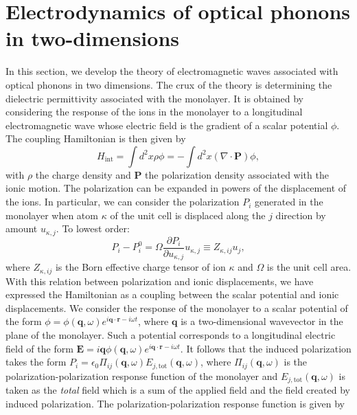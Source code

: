 \documentclass[aps,prb,twocolumn,
	groupedaddress,superscriptaddress,
	amsfonts,amssymb,amsmath,floatfix,
	citeautoscript]{revtex4-1}
\begin{document}
\section{Electrodynamics of optical phonons in two-dimensions}

In this section, we develop the theory of electromagnetic waves associated with optical phonons in two dimensions. The crux of the theory is determining the dielectric permittivity associated with the monolayer. It is obtained by considering the response of the ions in the monolayer to a longitudinal electromagnetic wave whose electric field is the gradient of a scalar potential $\phi$. The coupling Hamiltonian is then given by
\begin{equation}
H_{\mathrm{int}} = \int d^2x \rho \phi = -\int d^2x (\nabla\cdot\mathbf{P})\phi,
\end{equation} 
with $\rho$ the charge density and $\mathbf{P}$ the polarization density associated with the ionic motion. The polarization can be expanded in powers of the displacement of the ions. In particular, we can consider the polarization $P_i$ generated in the monolayer when atom $\kappa$ of the unit cell is displaced along the $j$ direction by amount $u_{\kappa,j}$. To lowest order:
\begin{equation}
P_i - P_i^{0} = \Omega\frac{\partial P_i}{\partial u_{\kappa,j}}u_{\kappa,j} \equiv Z_{\kappa,ij}u_{j},
\end{equation} 
where $Z_{\kappa,ij}$ is the Born effective charge tensor of ion $\kappa$ and $\Omega$ is the unit cell area. With this relation between polarization and ionic displacements, we have expressed the Hamiltonian as a coupling between the scalar potential and ionic displacements. We consider the response of the monolayer to a scalar potential of the form $\phi = \phi(\mathbf{q},\omega)e^{i\mathbf{q}\cdot\mathbf{r}-i\omega t}$, where $\mathbf{q}$ is a two-dimensional wavevector in the plane of the monolayer. Such a potential corresponds to a longitudinal electric field of the form $\mathbf{E} = i\mathbf{q}\phi(\mathbf{q},\omega)e^{i\mathbf{q}\cdot\mathbf{r}-i\omega t}$. It follows that the induced polarization takes the form $P_i  = \epsilon_0\Pi_{ij}(\mathbf{q},\omega)E_{j,\mathrm{tot}}(\mathbf{q},\omega)$, where $\Pi_{ij}(\mathbf{q},\omega)$ is the polarization-polarization response function of the monolayer and  $E_{j,\mathrm{tot}}(\mathbf{q},\omega)$ is taken as the \textit{total} field which is a sum of the applied field and the field created by induced polarization. The polarization-polarization response function is given by
\end{document}
